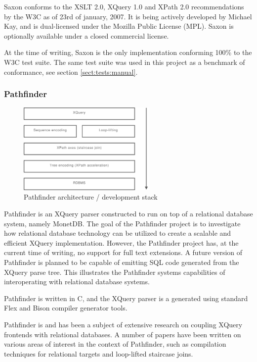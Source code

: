 Saxon conforms to the XSLT 2.0, XQuery 1.0 and XPath 2.0 recommendations
by the W3C as of 23rd of january, 2007. It is being actively
developed by Michael Kay, and is dual-licensed under the Mozilla Public License
(MPL). Saxon is optionally available under a closed commercial license.

At the time of writing, Saxon is the only implementation conforming 100\% to
the W3C test suite\cite{w3ctestresults}. The same test suite was used in this
project as a benchmark of conformance, see section \ref{sect:tests:manual}.

\subsubsection{Pathfinder}
\label{sect:soa:pathfinder}
\begin{figure}[!h]
  \centering
    \includegraphics[width=0.6\textwidth]{diagrams/pathfinder_arch}
  \caption{Pathfinder architecture / development stack}
\end{figure}

Pathfinder\cite{pathfinderHome} is an XQuery parser constructed to run on top of a relational
database system, namely MonetDB. The goal of the Pathfinder project is to
investigate how relational database technology can be utilized to create a
scalable and efficient XQuery implementation. However, the Pathfinder project
has, at the current time of writing, no support for full text extensions. A
future version of Pathfinder is planned to be capable of emitting SQL code
generated from the XQuery parse tree. This illustrates the Pathfinder systems
capabilities of interoperating with relational database systems.

Pathfinder is written in C, and the XQuery parser is a generated using standard
Flex and Bison compiler generator tools.

Pathfinder is and has been a subject of extensive research on coupling XQuery
frontends with relational databases. A number of papers have been written 
on various areas of interest in the context of Pathfinder, such as compilation
techniques for relational targets\cite{pathfinder_comptech} and loop-lifted
staircase joins\cite{pathfinder_staircase}.
